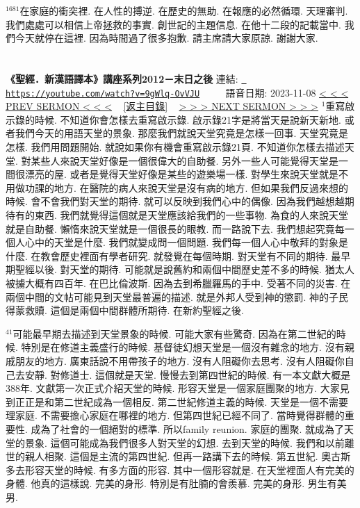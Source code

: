 \documentclass{book}
\begin{document}
$^{1681}$在家庭的衝突裡.
在人性的搏逆.
在歷史的無助.
在報應的必然循環.
天理審判.
我們處處可以相信上帝拯救的事實.
創世記的主題信息.
在他十二段的記載當中.
我們今天就停在這裡.
因為時間過了很多抱歉.
請主席請大家原諒.
謝謝大家.
\newpage



\section{}
\label{sec:9gWlq_OvVJU}
\textbf{《聖經．新漢語譯本》講座系列2012－末日之後}
\newline
\newline
連結: \href{https://youtube.com/watch?v=9gWlq-OvVJU}{\texttt{ https://youtube.com/watch?v=9gWlq-OvVJU}} ~~~~ 語音日期: 2023-11-08 
\newline
\newline
\hyperref[sec:ok3V257cOIA]{\small{< < < PREV SERMON < < <}}
~
\hyperref[sec:index]{\small{[返主目錄]}}
~
\hyperref[sec:L7Klx5S64nM]{\small{> > > NEXT SERMON > > >}}
\newline
\newline
$^{1}$重寫啟示錄的時候.
不知道你會怎樣去重寫啟示錄.
啟示錄21字是將當天是說新天新地.
或者我們今天的用語天堂的景象.
那麼我們就說天堂究竟是怎樣一回事.
天堂究竟是怎樣.
我們用問題開始.
就說如果你有機會重寫啟示錄21頁.
不知道你怎樣去描述天堂.
對某些人來說天堂好像是一個很偉大的自助餐.
另外一些人可能覺得天堂是一間很漂亮的屋.
或者是覺得天堂好像是某些的遊樂場一樣.
對學生來說天堂就是不用做功課的地方.
在醫院的病人來說天堂是沒有病的地方.
但如果我們反過來想的時候.
會不會我們對天堂的期待.
就可以反映到我們心中的偶像.
因為我們越想越期待有的東西.
我們就覺得這個就是天堂應該給我們的一些事物.
為食的人來說天堂就是自助餐.
懶惰來說天堂就是一個很長的眼教.
而一路說下去.
我們想起究竟每一個人心中的天堂是什麼.
我們就變成問一個問題.
我們每一個人心中敬拜的對象是什麼.
在教會歷史裡面有學者研究.
就發覺在每個時期.
對天堂有不同的期待.
最早期聖經以後.
對天堂的期待.
可能就是說舊約和兩個中間歷史差不多的時候.
猶太人被擄大概有四百年.
在巴比倫波斯.
因為去到希臘羅馬的手中.
受著不同的災害.
在兩個中間的文帖可能見到天堂最普遍的描述.
就是外邦人受到神的懲罰.
神的子民得蒙救贖.
這個是兩個中間群體所期待.
在新約聖經之後.

$^{41}$可能最早期去描述到天堂景象的時候.
可能大家有些驚奇.
因為在第二世紀的時候.
特別是在修道主義盛行的時候.
基督徒幻想天堂是一個沒有雜念的地方.
沒有親戚朋友的地方.
廣東話說不用帶孩子的地方.
沒有人阻礙你去思考.
沒有人阻礙你自己去安靜.
對修道士.
這個就是天堂.
慢慢去到第四世紀的時候.
有一本文獻大概是388年.
文獻第一次正式介紹天堂的時候.
形容天堂是一個家庭團聚的地方.
大家見到正正是和第二世紀成為一個相反.
第二世紀修道主義的時候.
天堂是一個不需要理家庭.
不需要擔心家庭在哪裡的地方.
但第四世紀已經不同了.
當時覺得群體的重要性.
成為了社會的一個絕對的標準.
所以family reunion.
家庭的團聚.
就成為了天堂的景象.
這個可能成為我們很多人對天堂的幻想.
去到天堂的時候.
我們和以前離世的親人相聚.
這個是主流的第四世紀.
但再一路講下去的時候.
第五世紀.
奧古斯多去形容天堂的時候.
有多方面的形容.
其中一個形容就是.
在天堂裡面人有完美的身體.
他真的這樣說.
完美的身形.
特別是有肚腩的會羨慕.
完美的身形.
男生有美男.
\end{document}

